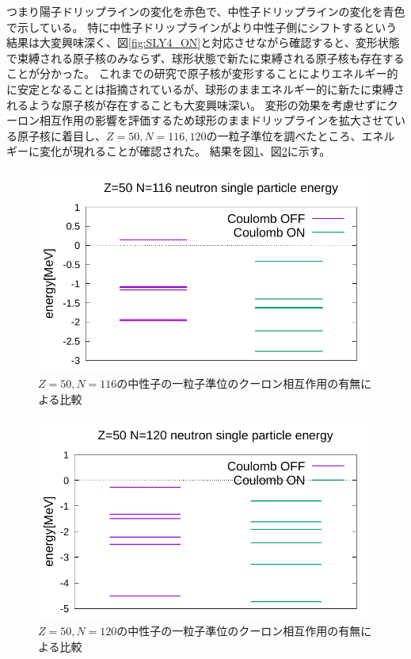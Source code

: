 \documentclass[12pt]{jarticle}
\begin{document}
つまり陽子ドリップラインの変化を赤色で、中性子ドリップラインの変化を青色で示している。
特に中性子ドリップラインがより中性子側にシフトするという結果は大変興味深く、図\ref{fig:SLY4_ON}と対応させながら確認すると、変形状態で束縛される原子核のみならず、球形状態で新たに束縛される原子核も存在することが分かった。
これまでの研究で原子核が変形することによりエネルギー的に安定となることは指摘されているが、球形のままエネルギー的に新たに束縛されるような原子核が存在することも大変興味深い。
変形の効果を考慮せずにクーロン相互作用の影響を評価するため球形のままドリップラインを拡大させている原子核に着目し、$Z=50,N=116,120$の一粒子準位を調べたところ、エネルギーに変化が現れることが確認された。
結果を図\ref{fig:spe50-116}、図\ref{fig:spe50-120}に示す。
\begin{figure}[H]
    \centering
    \includegraphics{../Z=50_N=116_speN.pdf}
    \setlength\floatsep{0pt}
    \caption{
        $Z=50,N=116$の中性子の一粒子準位のクーロン相互作用の有無による比較
        }\label{fig:spe50-116}
\end{figure}
\begin{figure}[H]
    \centering
    \includegraphics{../Z=50_N=120_speN.pdf}
    \setlength\floatsep{0pt}
    \caption{
        $Z=50,N=120$の中性子の一粒子準位のクーロン相互作用の有無による比較
        }\label{fig:spe50-120}
\end{figure}
\end{document}
